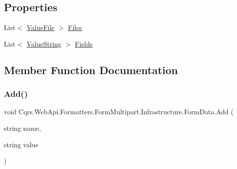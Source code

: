 \subsection*{Properties}
\begin{DoxyCompactItemize}
\item 
List$<$ \hyperlink{classCqrs_1_1WebApi_1_1Formatters_1_1FormMultipart_1_1Infrastructure_1_1FormData_1_1ValueFile}{Value\+File} $>$ \hyperlink{classCqrs_1_1WebApi_1_1Formatters_1_1FormMultipart_1_1Infrastructure_1_1FormData_a09da7b76f703fc20899051d9d9ed17b0_a09da7b76f703fc20899051d9d9ed17b0}{Files}
\item 
List$<$ \hyperlink{classCqrs_1_1WebApi_1_1Formatters_1_1FormMultipart_1_1Infrastructure_1_1FormData_1_1ValueString}{Value\+String} $>$ \hyperlink{classCqrs_1_1WebApi_1_1Formatters_1_1FormMultipart_1_1Infrastructure_1_1FormData_a91cfdcbb3a074aadee7e7fc228c04a6a_a91cfdcbb3a074aadee7e7fc228c04a6a}{Fields}
\end{DoxyCompactItemize}


\subsection{Member Function Documentation}
\mbox{\label{classCqrs_1_1WebApi_1_1Formatters_1_1FormMultipart_1_1Infrastructure_1_1FormData_a901e35133be31392947951d78632e593_a901e35133be31392947951d78632e593}} 
\subsubsection{\texorpdfstring{Add()}{Add()}\hspace{0.1cm}{\footnotesize\ttfamily [1/2]}}
{\footnotesize\ttfamily void Cqrs.\+Web\+Api.\+Formatters.\+Form\+Multipart.\+Infrastructure.\+Form\+Data.\+Add (\begin{DoxyParamCaption}\item[{string}]{name,  }\item[{string}]{value }\end{DoxyParamCaption})}

